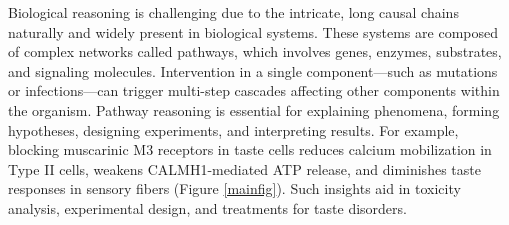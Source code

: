 






Biological reasoning is challenging due to the intricate, long causal chains naturally and widely present in biological systems. These systems are composed of complex networks called pathways, which involves genes, enzymes, substrates, and signaling molecules. Intervention in a single component—such as mutations or infections—can trigger multi-step cascades affecting other components within the organism. Pathway reasoning is essential for explaining phenomena, forming hypotheses, designing experiments, and interpreting results. For example, blocking muscarinic M3 receptors in taste cells reduces calcium mobilization in Type II cells, weakens CALMH1-mediated ATP release, and diminishes taste responses in sensory fibers (Figure \ref{mainfig}). Such insights aid in toxicity analysis, experimental design, and treatments for taste disorders.

